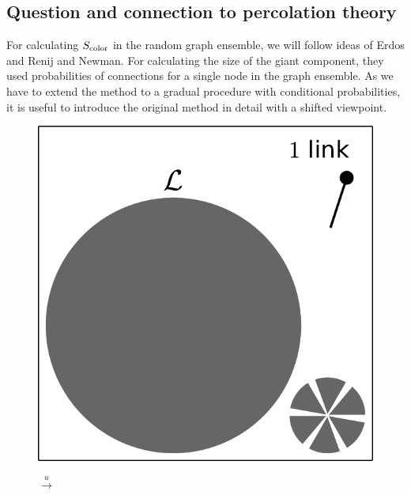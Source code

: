 \documentclass[aps, pre, onecolumn, a4paper, floatfix]{revtex4}
\begin{document}
\subsection{Question and connection to percolation theory}

For calculating $S_{\rm color}$ in the random graph ensemble, 
we will follow ideas of Erdos and Renij and Newman. 
For calculating the size of the giant component, 
they used probabilities of connections for a single node in the graph ensemble. 
As we have to extend the method to a gradual procedure with conditional probabilities, 
it is useful to introduce the original method in detail with a shifted viewpoint. 

\begin{figure}[htb]
  \begin{minipage}[b]{0.18\linewidth}
    \begin{center}
      \includegraphics[width=0.99\columnwidth]{sets_gc_all1.pdf}
   \end{center}
  \end{minipage}
  \begin{minipage}[b]{0.05\linewidth}
    \begin{center}
      {\large $\xrightarrow{u}$}\\
      \vspace{15mm}
    \end{center}

\end{minipage}
\end{figure}
\end{document}
